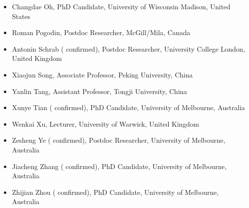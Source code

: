 \documentclass{article}
\begin{document}
\begin{itemize}[leftmargin=10pt,nosep]
\item Changdae Oh, PhD Candidate,  University of Wisconsin Madison, United States
\item Roman Pogodin, Postdoc Researcher, McGill/Mila, Canada
\item Antonin Schrab ({\color{blue} confirmed}), Postdoc Researcher, University College London, United Kingdom
\item Xiaojun Song, Associate Professor, Peking University, China
\item Yanlin Tang, Assistant Professor, Tongji University, China
\item Xunye Tian ({\color{blue} confirmed}), PhD Candidate, University of Melbourne, Australia
\item Wenkai Xu, Lecturer, University of Warwick, United Kingdom
\item Zesheng Ye ({\color{blue} confirmed}), Postdoc Researcher, University of Melbourne, Australia
\item Jiacheng Zhang ({\color{blue} confirmed}), PhD Candidate, University of Melbourne, Australia
\item Zhijian Zhou ({\color{blue} confirmed}), PhD Candidate, University of Melbourne, Australia
\end{itemize}



\newpage



\end{document}

